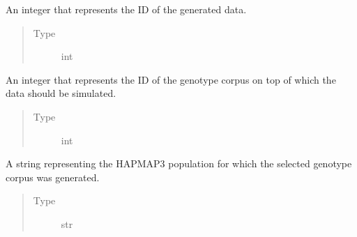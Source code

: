 \documentclass[a4paper,10pt,english]{sphinxhowto}
\begin{document}
\begin{fulllineitems}
\begin{fulllineitems}
\begin{quote}
\begin{description}
\end{description}\end{quote}

\end{fulllineitems}


\begin{fulllineitems}
\label{\detokenize{utils:utils.data_simulator.DataSimulator.sim_id}}
An integer that represents the ID of the generated data.
\begin{quote}\begin{description}
\item[{Type}] \leavevmode
int

\end{description}\end{quote}

\end{fulllineitems}


\begin{fulllineitems}
\label{\detokenize{utils:utils.data_simulator.DataSimulator.corpus_id}}
An integer that represents the ID of the genotype corpus on top of which
the data should be simulated.
\begin{quote}\begin{description}
\item[{Type}] \leavevmode
int

\end{description}\end{quote}

\end{fulllineitems}


\begin{fulllineitems}
\label{\detokenize{utils:utils.data_simulator.DataSimulator.pop}}
A string representing the HAPMAP3 population for which the selected genotype corpus was
generated.
\begin{quote}\begin{description}
\item[{Type}] \leavevmode
str


\end{description}
\end{quote}
\end{fulllineitems}
\end{fulllineitems}
\end{document}
